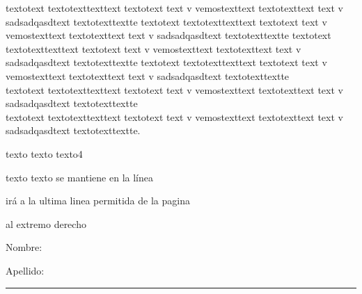 \documentclass{report}
\begin{document}
\begin{minipage}{5cm}
textotext textotexttexttext textotext text v vemostexttext textotexttext text v sadsadqasdtext textotexttextte
textotext textotexttexttext textotext text v vemostexttext textotexttext text v sadsadqasdtext textotexttextte
textotext textotexttexttext textotext text v vemostexttext textotexttext text v sadsadqasdtext textotexttextte
textotext textotexttexttext textotext text v vemostexttext textotexttext text v sadsadqasdtext textotexttextte\\
textotext textotexttexttext textotext text v vemostexttext textotexttext text v sadsadqasdtext textotexttextte\\
textotext textotexttexttext textotext text v vemostexttext textotexttext text v sadsadqasdtext textotexttextte.%
\end{minipage}

texto texto  texto4


texto texto  se mantiene en la línea

\vfill

irá a la ultima linea permitida de la pagina

\hfill al extremo derecho

Nombre: \hrulefill

Apellido: \dotfill

\rule{\paperwidth}{\paperheight}

\newpage
\end{document}
